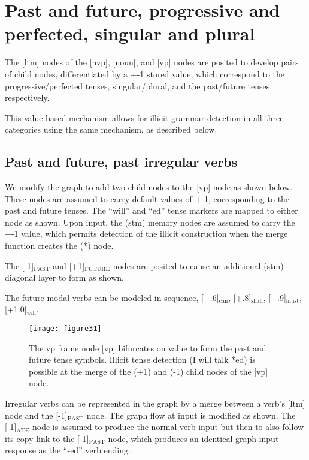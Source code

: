 \documentclass{clv3}
\begin{document}
\vspace{1cm}



\section{Past and future, progressive and perfected, singular and plural }                                                           

The [ltm] nodes of the [nvp], [noun], and [vp] nodes are posited to develop pairs of child nodes, differentiated by a +-1 stored value,  which correspond to the progressive/perfected tenses, singular/plural, and the past/future tenses, respectively.

This value based mechanism allows for illicit grammar detection in all three categories using the same mechanism, as described below. 



\subsection{Past and future, past irregular verbs}       


We modify the graph to add two child nodes to the [vp] node as shown below.  These nodes are assumed to carry default values of +-1, corresponding to the past and future tenses.  The ``will'' and ``ed'' tense markers are mapped to either node as shown.   Upon input, the (stm) memory nodes are assumed to carry the +-1 value, which permits detection of the illicit construction when the merge function creates the (*) node.  

The [-1]$_{\mathrm{PAST}}$ and [+1]$_{\mathrm{FUTURE}}$ nodes are posited to cause an additional (stm) diagonal layer to form as shown.

The future modal verbs can be modeled in sequence, [+.6]$_{\mathrm{can}}$, [+.8]$_{\mathrm{shall}}$, [+.9]$_{\mathrm{must}}$, [+1.0]$_{\mathrm{will}}$. 

\begin{figure}[H]
\texttt{[image: figure31]}
\caption{ The vp frame node [vp] bifurcates on value to form the past and future  tense symbols.   Illicit tense detection (I will talk *ed)  is possible at the merge of the (+1) and (-1) child nodes of the [vp] node. }
\end{figure}



Irregular verbs can be represented in the graph by a merge between a verb's [ltm] node and the [-1]$_{\mathrm{PAST}}$ node.  The graph flow at input is modified as shown.  The [-1]$_{\mathrm{ATE}}$ node is assumed to produce the normal verb input but then to also follow its copy link to the [-1]$_{\mathrm{PAST}}$ node, which produces an identical graph input response as the ``-ed'' verb ending.    
\end{document}
